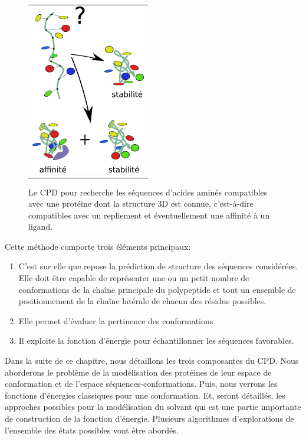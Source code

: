    \begin{figure}[!htbp]
     \centering
     \begin{tabular}{c}
       \includegraphics[width=5cm]{figure/CPD.png} &
     \end{tabular}
     
     \caption{Le CPD pour \og {}\fg recherche les séquences d'acides aminés compatibles avec une protéine dont la structure 3D  est connue, c'est-à-dire compatibles avec un repliement et éventuellement une affinité à un ligand.}
\label{graph:CPD}
   \end{figure}


Cette méthode comporte trois éléments principaux:
\begin{enumerate}
\item {}
  
  C'est sur elle que repose la prédiction de structure des séquences considérées. Elle doit être capable de représenter une ou un petit nombre de conformations de la chaîne principale du polypeptide et tout un ensemble de positionnement de la chaîne latérale de chacun des résidus possibles.
\item {}

  Elle permet d'évaluer la pertinence des conformations 
\item {}

  Il exploite la fonction d'énergie pour échantillonner les séquences favorables.
  
\end{enumerate}

Dans la suite de ce chapitre, nous détaillons les trois composantes du CPD. Nous aborderons le problème de la modélisation des protéines de leur espace de conformation et de l'espace séquences-conformations. Puis, nous verrons les fonctions d'énergies classiques pour une conformation. Et, seront détaillés, les approches possibles pour la modélisation du solvant qui est une partie importante de construction de la fonction d'énergie. Plusieurs algorithmes d'explorations de l'ensemble des états possibles vont être abordés.  



